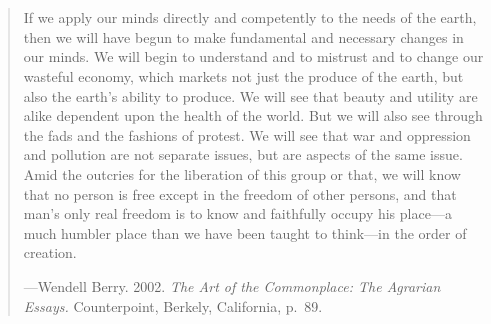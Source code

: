 

\chapter*{}
\chaptermark{}

\thispagestyle{empty} %

\vspace*{50 mm}

\small{}

\begin{quote}
	If we apply our minds directly and competently to the needs of the earth, 
	then we will have begun to make fundamental and necessary changes in our minds. 
	We will begin to understand and to mistrust and to change our wasteful economy, 
	which markets not just the produce of the earth, 
	but also the earth's ability to produce. 
	We will see that beauty and utility are alike dependent upon the health of the world. 
	But we will also see through the fads and the fashions of protest. 
	We will see that war and oppression and pollution are not separate issues, 
	but are aspects of the same issue. 
	Amid the outcries for the liberation of this group or that, 
	we will know that no person is free except in the freedom of other persons, 
	and that man's only real freedom 
	is to know and faithfully occupy his place---a much humbler place 
	than we have been taught to think---in the order of creation.

	\hfill---Wendell Berry. 2002. \emph{The Art of the Commonplace: The Agrarian Essays.}
	Counterpoint, Berkely, California, p.~89.
\end{quote}


\normalsize{}
